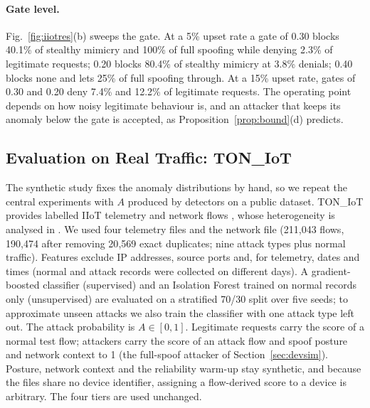 \begin{table}[t]
\centering
\caption{Per-tier results: legitimate requests allowed and attacker requests accepted (\%)}
\label{tab:tiersres}
\scriptsize
\setlength{\tabcolsep}{2.2pt}

\par\smallskip{}
\end{table}

\paragraph{Gate level.}\label{sec:gate_eval} Fig.~\ref{fig:iiotres}(b) sweeps the gate. At a 5\% upset rate a gate of 0.30 blocks 40.1\% of stealthy mimicry and 100\% of full spoofing while denying 2.3\% of legitimate requests; 0.20 blocks 80.4\% of stealthy mimicry at 3.8\% denials; 0.40 blocks none and lets 25\% of full spoofing through. At a 15\% upset rate, gates of 0.30 and 0.20 deny 7.4\% and 12.2\% of legitimate requests. The operating point depends on how noisy legitimate behaviour is, and an attacker that keeps its anomaly below the gate is accepted, as Proposition~\ref{prop:bound}(d) predicts.

\subsection{Evaluation on Real Traffic: TON\_IoT}\label{sec:real_eval}
The synthetic study fixes the anomaly distributions by hand, so we repeat the central experiments with $A$ produced by detectors on a public dataset. TON\_IoT provides labelled IIoT telemetry \cite{alsaedi2020ton} and network flows \cite{moustafa2021network}, whose heterogeneity is analysed in \cite{booij2022ton}. We used four telemetry files and the network file (211{,}043 flows, 190{,}474 after removing 20{,}569 exact duplicates; nine attack types plus normal traffic). Features exclude IP addresses, source ports and, for telemetry, dates and times (normal and attack records were collected on different days). A gradient-boosted classifier (supervised) and an Isolation Forest trained on normal records only (unsupervised) are evaluated on a stratified 70/30 split over five seeds; to approximate unseen attacks we also train the classifier with one attack type left out. The attack probability is $A\in[0,1]$. Legitimate requests carry the score of a normal test flow; attackers carry the score of an attack flow and spoof posture and network context to 1 (the full-spoof attacker of Section~\ref{sec:devsim}). Posture, network context and the reliability warm-up stay synthetic, and because the files share no device identifier, assigning a flow-derived score to a device is arbitrary. The four tiers are used unchanged.


